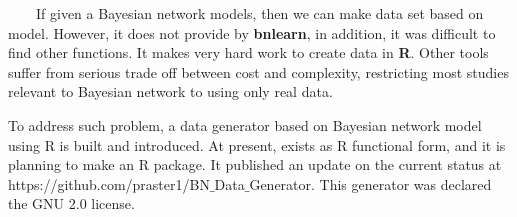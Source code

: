 ~~~~If given a Bayesian network models, then we can make data set based on model. However, it does not provide by \textbf{bnlearn}, in addition, it was difficult to find other functions. It makes very hard work to create data in \textbf{R}. Other tools suffer from serious trade off between cost and complexity, restricting most studies relevant to Bayesian network to using only real data.

To address such problem, a data generator based on Bayesian network model using R is built and introduced. At present, exists as R functional form, and it is planning to make an R package. It  published an update on the current status at https://github.com/praster1/BN$\_$Data$\_$Generator. This generator was declared the GNU 2.0 license.